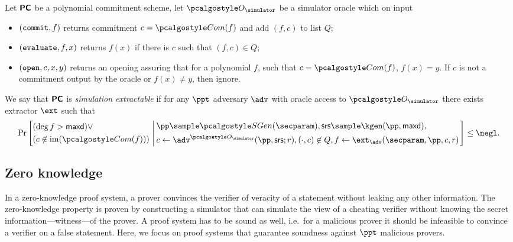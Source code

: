 \documentclass[runningheads,11pt]{llncs}
\begin{document}
\begin{definition}
  Let $\bm{\mathsf{PC}}$ be a polynomial commitment scheme, let $\oracles$ be a simulator oracle
  which on input
  \begin{itemize}
  \item $(\mathtt{commit}, f)$ returns commitment $c = \com(f)$ and add $(f, c)$ to
    list $Q$;
  \item $(\mathtt{evaluate}, f, x)$ returns $f(x)$ if there is $c$ such that $(f,
    c) \in Q$; 
  \item $(\mathtt{open}, c, x, y)$ returns an opening assuring that for a
    polynomial $f$, such that $c = \com(f)$, $f(x) = y$. If $c$ is not a
    commitment output by the oracle or $f(x) \neq y$, then ignore.
  \end{itemize}
  We say that $\bm{\mathsf{PC}}$ is \emph{simulation extractable} if for any $\ppt$
  adversary $\adv$ with oracle access to $\oracles$ there exists extractor
  $\ext$ such that
  \[
    \Pr\left[
      \begin{aligned}
        & (\deg{f} > \maxdeg) \lor\\
        & (c \not\in \image(\com(f)))
        \end{aligned}
        \,\left|\,
          \begin{aligned}
          & \pp \sample \sgen(\secparam),
           \srs \sample \kgen(\pp, \maxdeg),\\
           & c \gets \adv^{\oracles}(\pp, \srs; r),
           (\cdot, c) \not\in Q, 
           f \gets \ext_{\adv}(\secparam, \pp, c, r)
        \end{aligned}
      \right.  \right] \leq \negl.
  \]
  
\end{definition}

\subsection{Zero knowledge}
In a zero-knowledge proof system, a prover convinces the verifier of veracity of
a statement without leaking any other information. The zero-knowledge property
is proven by constructing a simulator that can simulate the view of a cheating
verifier without knowing the secret information---witness---of the prover. A
proof system has to be sound as well, i.e.~for a malicious prover it should be
infeasible to convince a verifier on a false statement. Here, we focus on proof
systems that guarantee soundness against $\ppt$ malicious provers.
\end{document}
